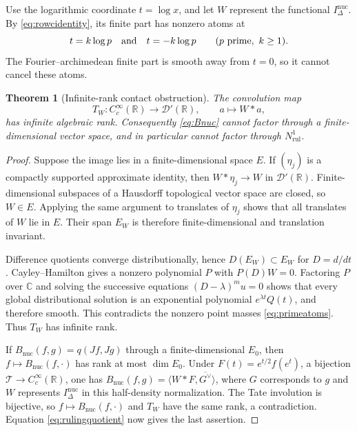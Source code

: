 \documentclass[11pt]{amsart}
\newtheorem{theorem}{Theorem}[section]
\theoremstyle{definition}
\theoremstyle{remark}
\newcommand{\R}{\mathbb R}
\begin{document}
Use the logarithmic coordinate $t=\log x$, and let $W$ represent the
functional $I_\Delta^{\mathrm{nuc}}$.  By \eqref{eq:rowcidentity}, its finite
part has nonzero atoms at
\begin{equation}\label{eq:primeatoms}
 t=k\log p\quad\hbox{and}\quad t=-k\log p
 \qquad(p\text{ prime},\ k\ge1).
\end{equation}
The Fourier--archimedean finite part is smooth away from $t=0$, so it cannot
cancel these atoms.

\begin{theorem}[Infinite-rank contact obstruction]
\label{thm:infiniterankcontact}
The convolution map
\[
 T_W:C_c^\infty(\mathbb R)\longrightarrow\mathcal D'(\mathbb R),
 \qquad a\longmapsto W*a,
\]
has infinite algebraic rank.  Consequently \eqref{eq:Bnuc} cannot factor
through a finite-dimensional vector space, and in particular cannot factor
through $N^1_{\mathrm{rul}}$.
\end{theorem}

\begin{proof}
Suppose the image lies in a finite-dimensional space $E$.  If $(\eta_j)$ is
a compactly supported approximate identity, then $W*\eta_j\to W$ in
$\mathcal D'(\mathbb R)$.  Finite-dimensional subspaces of a Hausdorff
topological vector space are closed, so $W\in E$.  Applying the same argument
to translates of $\eta_j$ shows that all translates of $W$ lie in $E$.
Their span $E_W$ is therefore finite-dimensional and translation invariant.

Difference quotients converge distributionally, hence
$D(E_W)\subset E_W$ for $D=d/dt$.  Cayley--Hamilton gives a nonzero
polynomial $P$ with $P(D)W=0$.  Factoring $P$ over $\mathbb C$ and solving
the successive equations $(D-\lambda)^m u=0$ shows that every global
distributional solution is an exponential polynomial
$e^{\lambda t}Q(t)$, and therefore smooth.  This contradicts the nonzero
point masses \eqref{eq:primeatoms}.  Thus $T_W$ has infinite rank.

If $B_{\mathrm{nuc}}(f,g)=q(Jf,Jg)$ through a finite-dimensional $E_0$,
then $f\mapsto B_{\mathrm{nuc}}(f,\cdot)$ has rank at most $\dim E_0$.
Under $F(t)=e^{t/2}f(e^t)$, a bijection $\mathcal T\to C_c^\infty(\R)$, one
has $B_{\mathrm{nuc}}(f,g)=\langle W*F,\overline{G^\vee}\rangle$, where $G$
corresponds to $g$ and $W$ represents $I_\Delta^{\mathrm{nuc}}$ in this
half-density normalization.  The Tate involution is bijective, so
$f\mapsto B_{\mathrm{nuc}}(f,\cdot)$ and $T_W$ have the same rank, a
contradiction.  Equation \eqref{eq:rulingquotient} now gives the last assertion.
\end{proof}
\end{document}
